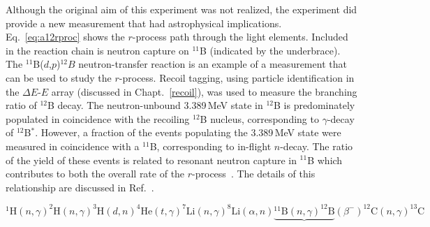Although %
the original aim of this experiment was not realized,
the experiment did provide a new measurement that had astrophysical implications.  Eq.~\ref{eq:a12rproc} shows the $r$-process path through the light elements.  Included in the reaction chain is neutron capture on $^{11}$B (indicated by the underbrace).  The $^{11}$B($d$,$p$)$^{12}B$ neutron-transfer reaction is an example of a measurement that can be used to study the $r$-process.  Recoil tagging, using particle identification in the $\Delta E$-$E$ array (discussed in Chapt.~\ref{recoil}), was used to measure the branching ratio of $^{12}$B decay.  The neutron-unbound 3.389\,MeV state in $^{12}$B is predominately populated in coincidence with the recoiling $^{12}$B nucleus, corresponding to $\gamma$-decay of $^{12}$B$^\textrm{*}$.  However, a fraction of the events populating the 3.389\,MeV state were measured in coincidence with a $^{11}$B, corresponding to in-flight $n$-decay.   The ratio of the yield of these events is related to resonant neutron capture in $^{11}$B which contributes to both the overall rate of the $r$-process~\cite{Surman_2009}.  The details of this relationship are discussed in Ref.~\cite{Lee_2010}.

\begin{equation}
^{1}\textrm{H}(n,\gamma)^{2}\textrm{H}(n,\gamma)^{3}\textrm{H}(d,n)^{4}\textrm{He}(t,\gamma)^{7}\textrm{Li}(n,\gamma)^{8}\textrm{Li}(\alpha,n)\underbrace{^{11}\textrm{B}(n,\gamma)^{12}\textrm{B}}(\beta^-)^{12}\textrm{C}(n,\gamma)^{13}\textrm{C}
\label{eq:a12rproc}
\end{equation}


